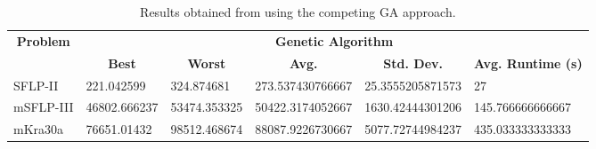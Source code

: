 \begin{table}[h!]
\begin{adjustwidth}{-1.15in}{}
\centering
\begin{tabular}{|l|l|l|l|l|l|}
	\hline
	\multicolumn{1}{|c|}{\multirow{2}{*}{\textbf{Problem}}} & \multicolumn{5}{c|}{\textbf{Genetic Algorithm}}                                                                                                                                                                                            \\ \cline{2-6} 
	\multicolumn{1}{|c|}{}                                  & \multicolumn{1}{c|}{\textbf{Best}} & \multicolumn{1}{c|}{\textbf{Worst}} & \multicolumn{1}{c|}{\textbf{Avg.}} & \multicolumn{1}{c|}{\textbf{Std. Dev.}} & \multicolumn{1}{c|}{\textbf{Avg. Runtime (s)}} \\ \hline
	SFLP-II                                                 & 221.042599                                  & 324.874681                                   & 273.537430766667                      &
	25.3555205871573						& 27                                   \\ \hline
	mSFLP-III                                               & 46802.666237                                & 53474.353325                                 & 50422.3174052667	                      & 1630.42444301206                                  & 145.766666666667                           \\ \hline
	mKra30a                                               & 76651.01432                                & 98512.468674                                 &
	88087.9226730667							&
	5077.72744984237	                        &
	435.033333333333								\\ \hline
\end{tabular}
\end{adjustwidth}
\caption{Results obtained from using the competing GA approach.}
\label{approach-ga-results}
\end{table}

